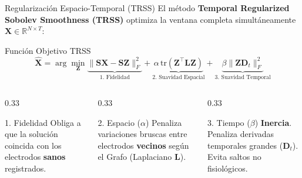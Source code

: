 \documentclass[10pt, aspectratio=169]{beamer}
\begin{document}
\begin{frame}{Regularización Espacio-Temporal (TRSS)}
    El método \textbf{Temporal Regularized Sobolev Smoothness (TRSS)} optimiza la ventana completa simultáneamente $\mathbf{X} \in \mathbb{R}^{N \times T}$:
    
    \vspace{0.2cm}
    \begin{exampleblock}{Función Objetivo TRSS}
    \[ \hat{\mathbf{X}} = \arg\min_{\mathbf{Z}} \underbrace{\| \mathbf{S}\mathbf{X} - \mathbf{S}\mathbf{Z} \|_F^2}_{\text{1. Fidelidad}} + \underbrace{\alpha \, \text{tr}(\mathbf{Z}^\top \mathbf{L} \mathbf{Z})}_{\text{2. Suavidad Espacial}} + \underbrace{\beta \| \mathbf{Z}\mathbf{D}_t \|_F^2}_{\text{3. Suavidad Temporal}} \]
    \end{exampleblock}
    \vspace{0.1cm}
    
    \begin{columns}
        \begin{column}{0.33\textwidth}
            \begin{alertblock}{1. Fidelidad}
                \centering Obliga a que la solución coincida con los electrodos \textbf{sanos} registrados.
            \end{alertblock}
        \end{column}
        \begin{column}{0.33\textwidth}
            \begin{block}{2. Espacio ($\alpha$)}
                \centering Penaliza variaciones bruscas entre electrodos \textbf{vecinos} según el Grafo (Laplaciano $\mathbf{L}$).
            \end{block}
        \end{column}
        \begin{column}{0.33\textwidth}
            \begin{block}{3. Tiempo ($\beta$)}
                \centering \textbf{Inercia}. Penaliza derivadas temporales grandes ($\mathbf{D}_t$). Evita saltos no fisiológicos.
            \end{block}
        \end{column}
    \end{columns}
\end{frame}
\end{document}
